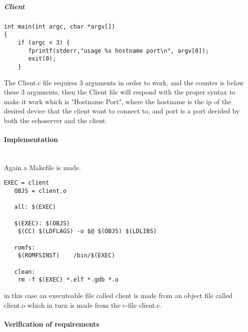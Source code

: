 \subparagraph{Client}
\begin{verbatim}
int main(int argc, char *argv[])
{
    if (argc < 3) {
       fprintf(stderr,"usage %s hostname port\n", argv[0]);
       exit(0);
    }
\end{verbatim}
The Client.c file requires 3 arguments in order to work, and the counter is below these 3 arguments, then the Client file will respond with the proper syntax to make it work which is "Hostname Port", where the hostname is the ip of the desired device that the client want to connect to, and port is a port decided by both the echoserver and the client.

\paragraph{Implementation}\mbox{}\\
Again a Makefile is made.
\begin{verbatim}
EXEC = client
   OBJS = client.o
 
   all: $(EXEC)
 
   $(EXEC): $(OBJS)
	$(CC) $(LDFLAGS) -o $@ $(OBJS) $(LDLIBS)
 
   romfs:
	$(ROMFSINST)    /bin/$(EXEC)
 
   clean:
	rm -f $(EXEC) *.elf *.gdb *.o
\end{verbatim}
in this case an executeable file called client is made from an object file called client.o which in turn is made from the c-file client.c. 
\paragraph{Verification of requirements}\mbox{}\\
